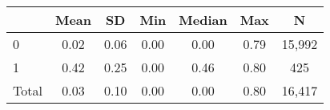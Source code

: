 {
\def\sym#1{\ifmmode^{#1}\else\(^{#1}\)\fi}
\begin{tabular}{l*{1}{cccccc}}
\hline\hline
                    &        Mean&          SD&         Min&      Median&         Max&           N\\
\hline
0                   &        0.02&        0.06&        0.00&        0.00&        0.79&      15,992\\
1                   &        0.42&        0.25&        0.00&        0.46&        0.80&         425\\
Total               &        0.03&        0.10&        0.00&        0.00&        0.80&      16,417\\
\hline\hline
\end{tabular}
}
